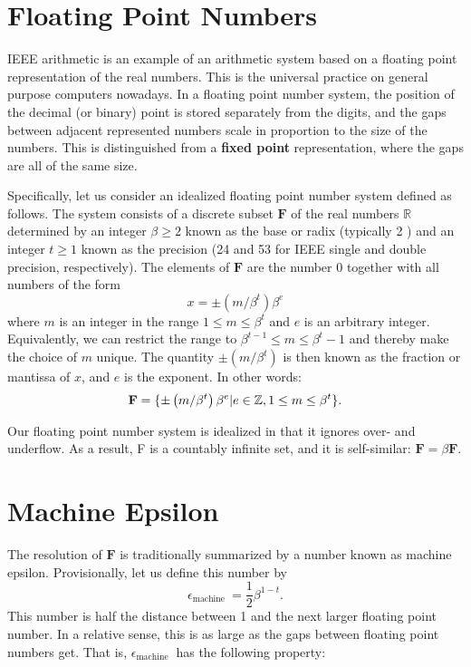 \section{Floating Point Numbers} 
IEEE arithmetic is an example of an arithmetic system based on a floating point representation of the real numbers. This is the universal practice on general purpose computers nowadays. In a floating point number system, the position of the decimal (or binary) point is stored separately from the digits, and the gaps between adjacent represented numbers scale in proportion to the size of the numbers. This is distinguished from a \textbf{fixed point} representation, where the gaps are all of the same size.

Specifically, let us consider an idealized floating point number system defined as follows. The system consists of a discrete subset $\mathbf{F}$ of the real numbers $\mathbb{R}$ determined by an integer $\beta \geq 2$ known as the base or radix (typically 2 ) and an integer $t \geq 1$ known as the precision (24 and 53 for IEEE single and double precision, respectively). The elements of $\mathbf{F}$ are the number 0 together with all numbers of the form
$$
x= \pm\left(m / \beta^t\right) \beta^e
$$
where $m$ is an integer in the range $1 \leq m \leq \beta^t$ and $e$ is an arbitrary integer. Equivalently, we can restrict the range to $\beta^{t-1} \leq m \leq \beta^t-1$ and thereby make the choice of $m$ unique. The quantity $\pm\left(m / \beta^t\right)$ is then known as the fraction or mantissa of $x$, and $e$ is the exponent. In other words: 
\[
    \mathbf{F} = \{\pm\left(m / \beta^t\right) \beta^e| e\in \mathbb{Z},  1\le m \le \beta ^t\}.  
\]

Our floating point number system is idealized in that it ignores over- and underflow. As a result, F is a countably infinite set, and it is self-similar: $\mathbf{F}=\beta \mathbf{F}$. 

\section{Machine Epsilon} 
The resolution of $\mathbf{F}$ is traditionally summarized by a number known as machine epsilon. Provisionally, let us define this number by
\begin{equation}
    \label{eq: machine epsilon}
    \epsilon_{\text {machine }}=\frac{1}{2} \beta^{1-t}. 
\end{equation}
This number is half the distance between 1 and the next larger floating point number. In a relative sense, this is as large as the gaps between floating point numbers get. That is, $\epsilon_{\text {machine }}$ has the following property:

